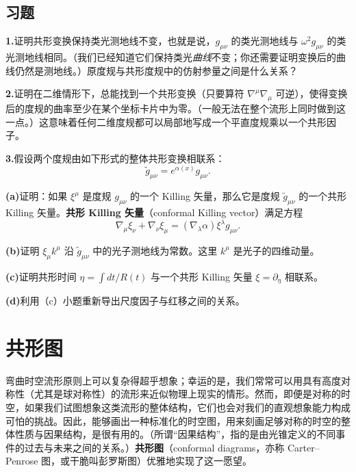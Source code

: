 \section{习题}

\textbf{1.}\quad 证明共形变换保持类光测地线不变，也就是说，$g_{\mu\nu}$ 的类光测地线与 $\omega^{2}g_{\mu\nu}$ 的类光测地线相同。（我们已经知道它们保持类光\emph{曲线}不变；你还需要证明变换后的曲线仍然是测地线。）原度规与共形度规中的仿射参量之间是什么关系？

\textbf{2.}\quad 证明在二维情形下，总能找到一个共形变换（只要算符 $\nabla^{\mu}\nabla_{\mu}$ 可逆），使得变换后的度规的曲率至少在某个坐标卡片中为零。（一般无法在整个流形上同时做到这一点。）这意味着任何二维度规都可以局部地写成一个平直度规乘以一个共形因子。

\textbf{3.}\quad 假设两个度规由如下形式的整体共形变换相联系：
\begin{equation*}
\tilde{g}_{\mu\nu} = e^{\alpha(x)} g_{\mu\nu}.
\tag{G.19}
\end{equation*}

\textbf{(a)}\quad 证明：如果 $\xi^{\mu}$ 是度规 $g_{\mu\nu}$ 的一个 Killing 矢量，那么它是度规 $\tilde{g}_{\mu\nu}$ 的一个共形 Killing 矢量。\textbf{共形 Killing 矢量}（conformal Killing vector）满足方程
\begin{equation*}
\nabla_{\mu}\xi_{\nu} + \nabla_{\nu}\xi_{\mu} = (\nabla_{\lambda}\alpha)\xi^{\lambda} g_{\mu\nu}.
\tag{G.20}
\end{equation*}

\textbf{(b)}\quad 证明 $\xi_{\mu}k^{\mu}$ 沿 $\tilde{g}_{\mu\nu}$ 中的光子测地线为常数。这里 $k^{\mu}$ 是光子的四维动量。

\textbf{(c)}\quad 证明共形时间 $\eta = \int dt/R(t)$ 与一个共形 Killing 矢量 $\xi = \partial_{\eta}$ 相联系。

\textbf{(d)}\quad 利用（c）小题重新导出尺度因子与红移之间的关系。

\chapter{共形图}

弯曲时空流形原则上可以复杂得超乎想象；幸运的是，我们常常可以用具有高度对称性（尤其是球对称性）的流形来近似物理上现实的情形。然而，即便是对称的时空，如果我们试图想象这类流形的整体结构，它们也会对我们的直观想象能力构成可怕的挑战。因此，能够画出一种标准化的时空图，用来刻画足够对称的时空的整体性质与因果结构，是很有用的。（所谓“因果结构”，指的是由光锥定义的不同事件的过去与未来之间的关系。）\textbf{共形图}（conformal diagrams，亦称 Carter--Penrose 图，或干脆叫彭罗斯图）优雅地实现了这一愿望。

